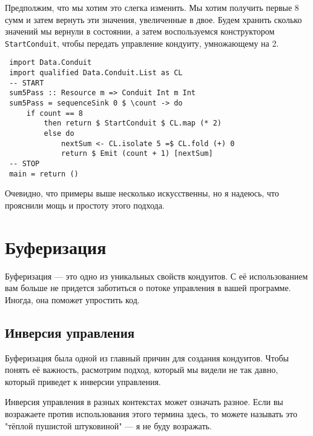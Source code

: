 Предполжим, что мы хотим это слегка изменить. Мы хотим получить первые 8 сумм и 
затем вернуть эти значения, увеличенные в двое. Будем хранить сколько значений 
мы вернули в состоянии, а затем воспользуемся конструктором 
\lstinline'StartConduit', чтобы передать управление кондуиту, умножающему на 2.
\begin{lstlisting}
 import Data.Conduit
 import qualified Data.Conduit.List as CL
 -- START
 sum5Pass :: Resource m => Conduit Int m Int
 sum5Pass = sequenceSink 0 $ \count -> do
     if count == 8
         then return $ StartConduit $ CL.map (* 2)
         else do
             nextSum <- CL.isolate 5 =$ CL.fold (+) 0
             return $ Emit (count + 1) [nextSum]
 -- STOP
 main = return ()
\end{lstlisting}
Очевидно, что примеры выше несколько искусственны, но я надеюсь, что прояснили 
мощь и простоту этого подхода. 
 
\section{Буферизация}

Буферизация --- это одно из уникальных свойств кондуитов. С её использованием 
вам больше не придется заботиться о потоке управления в вашей программе.
Иногда, она поможет упростить код.

\subsection{Инверсия управления}

Буферизация была одной из главный причин для создания кондуитов. Чтобы понять её 
важность, расмотрим подход, который мы видели не так давно, который приведет к 
инверсии управления.

\begin{remark}
Инверсия управления в разных контекстах может означать разное. Если вы возражаете 
против использования этого термина здесь, то можете называть это 
"тёплой пушистой штуковиной" --- я не буду возражать.
\end{remark}

